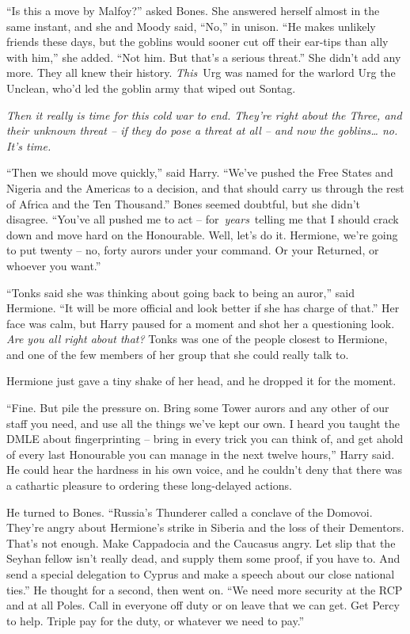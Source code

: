 ``Is this a move by Malfoy?'' asked Bones. She answered herself almost
in the same instant, and she and Moody said, ``No,'' in unison. ``He
makes unlikely friends these days, but the goblins would sooner cut off
their ear-tips than ally with him,'' she added. ``Not him. But that's a
serious threat.'' She didn't add any more. They all knew their history.
\emph{This}~Urg was named for the warlord Urg the Unclean, who'd led the
goblin army that wiped out Sontag.

\emph{Then it really is time for this cold war to end. They're right
about the Three, and their unknown threat -- if they do pose a threat at
all -- and now the goblins\ldots{} no. It's time.}

``Then we should move quickly,'' said Harry. ``We've pushed the Free
States and Nigeria and the Americas to a decision, and that should carry
us through the rest of Africa and the Ten Thousand.'' Bones seemed
doubtful, but she didn't disagree. ``You've all pushed me to act --
for~\emph{years}~telling me that I should crack down and move hard on
the Honourable. Well, let's do it. Hermione, we're going to put twenty
-- no, forty aurors under your command. Or your Returned, or whoever you
want.''

``Tonks said she was thinking about going back to being an auror,'' said
Hermione. ``It will be more official and look better if she has charge
of that.'' Her face was calm, but Harry paused for a moment and shot her
a questioning look. \emph{Are you all right about that?} Tonks was one
of the people closest to Hermione, and one of the few members of her
group that she could really talk to.

Hermione just gave a tiny shake of her head, and he dropped it for the
moment.

``Fine. But pile the pressure on. Bring some Tower aurors and any other
of our staff you need, and use all the things we've kept our own. I
heard you taught the DMLE about fingerprinting -- bring in every trick
you can think of, and get ahold of every last Honourable you can manage
in the next twelve hours,'' Harry said. He could hear the hardness in
his own voice, and he couldn't deny that there was a cathartic pleasure
to ordering these long-delayed actions.

He turned to Bones. ``Russia's Thunderer called a conclave of the
Domovoi. They're angry about Hermione's strike in Siberia and the loss
of their Dementors. That's not enough. Make Cappadocia and the Caucasus
angry. Let slip that the Seyhan fellow isn't really dead, and supply
them some proof, if you have to. And send a special delegation to Cyprus
and make a speech about our close national ties.'' He thought for a
second, then went on. ``We need more security at the RCP and at all
Poles. Call in everyone off duty or on leave that we can get. Get Percy
to help. Triple pay for the duty, or whatever we need to pay.''

